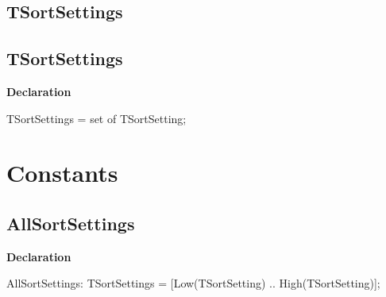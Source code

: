 \documentclass{report}
\newif\ifpdf
\begin{document}
\subsection*{\large{\textbf{TSortSettings}}\normalsize\hspace{1ex}\hrulefill}
\else
\subsection*{TSortSettings}
\fi
\label{PasDoc_SortSettings-TSortSettings}
\begin{list}{}{
\setlength{\itemindent}{0cm}
\setlength{\listparindent}{0cm}
\setlength{\leftmargin}{\evensidemargin}
\addtolength{\leftmargin}{\tmplength}
\settowidth{\labelsep}{X}
\addtolength{\leftmargin}{\labelsep}
\setlength{\labelwidth}{\tmplength}
}
\item[\textbf{Declaration}\hfill]
\ifpdf
\begin{flushleft}
\fi
\begin{ttfamily}
TSortSettings = set of TSortSetting;\end{ttfamily}

\ifpdf
\end{flushleft}
\fi

\end{list}
\section{Constants}
\ifpdf
\subsection*{\large{\textbf{AllSortSettings}}\normalsize\hspace{1ex}\hrulefill}
\else
\subsection*{AllSortSettings}
\fi
\label{PasDoc_SortSettings-AllSortSettings}
\begin{list}{}{
\setlength{\itemindent}{0cm}
\setlength{\listparindent}{0cm}
\setlength{\leftmargin}{\evensidemargin}
\addtolength{\leftmargin}{\tmplength}
\settowidth{\labelsep}{X}
\addtolength{\leftmargin}{\labelsep}
\setlength{\labelwidth}{\tmplength}
}
\item[\textbf{Declaration}\hfill]
\ifpdf
\begin{flushleft}
\fi
\begin{ttfamily}
AllSortSettings: TSortSettings = [Low(TSortSetting) .. High(TSortSetting)];\end{ttfamily}

\ifpdf
\end{flushleft}
\fi

\end{list}
\ifpdf
\end{document}
